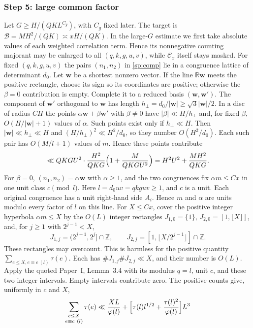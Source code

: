 \subsubsection*{Step 5: large common factor}
Let $G\ge H/(QKL^{C_g})$, with $C_g$ fixed later. The target is
$\mathcal B=MH^2/(QK)\asymp xH/(QK)$. In the large-$G$ estimate
we first take absolute values of each weighted correlation term.
Hence its nonnegative counting majorant may be enlarged to all
$(q,k,g,u,v)$, while $\mathcal C_x$ itself stays masked.
For fixed $(q,k,g,u,v)$ the pairs
$(n_1,n_2)$ in \eqref{sp:comp} lie in a congruence lattice of determinant
$d_0$. Let
$\mathbf w$ be a shortest nonzero vector. If the line
$\mathbb R\mathbf w$ meets the positive rectangle, choose its sign so its
coordinates are positive; otherwise the $\beta=0$ contribution is empty.
Complete it to a reduced basis
$(\mathbf w,\mathbf w')$. The component of $\mathbf w'$ orthogonal to
$\mathbf w$ has length $h_\perp=d_0/|\mathbf w|\ge\sqrt3|\mathbf w|/2$. In a
disc of radius $CH$ the points $\alpha\mathbf w+\beta\mathbf w'$ with
$\beta\ne0$ have $|\beta|\ll H/h_\perp$ and, for fixed $\beta$,
$O(H/|\mathbf w|+1)$ values of $\alpha$. Such points exist only if
$h_\perp\ll H$. Then $|\mathbf w|\ll h_\perp\ll H$ and
$(H/h_\perp)^2\ll H^2/d_0$, so they number $O(H^2/d_0)$. Each such pair has $O(M/l+1)$ values of
$m$. Hence these points contribute
\[
 \ll QKGU^2\cdot\frac{H^2}{QKG}\Bigl(1+\frac M{QKGU^2}\Bigr)=H^2U^2+\frac{MH^2}{QKG}.
\]
For $\beta=0$, $(n_1,n_2)=\alpha\mathbf w$ with $\alpha\ge1$, and the two
congruences fix $\alpha m\le Cx$ in one unit class $c\pmod l$.
Here $l=d_0uv=qkguv\ge1$, and $c$ is a unit. Each original
congruence has a unit right-hand side $A_i$. Hence $m$ and $\alpha$
are units modulo every factor of $l$ on this line.
For $X\le Cx$, cover the positive integer hyperbola $\alpha m\le X$
by the $O(L)$ integer rectangles $J_{1,0}=\{1\}$,
$J_{2,0}=[1,\lfloor X\rfloor]$, and, for $j\ge1$ with $2^{j-1}<X$,
\[
 J_{1,j}=(2^{j-1},2^j]\cap\mathbb Z,\qquad
 J_{2,j}=[1,\lfloor X/2^{j-1}\rfloor]\cap\mathbb Z.
\]
These rectangles may overcount. This is harmless for the positive
quantity $\sum_{e\le X,e\equiv c\ (l)}\tau(e)$. Each has
$\#J_{1,j}\#J_{2,j}\ll X$, and their number is $O(L)$.
Apply the quoted Paper~I, Lemma~3.4 with its modulus
$q=l$, unit $c$, and these two integer intervals. Empty intervals
contribute zero. The positive counts give, uniformly in $c$ and $X$,
\begin{equation}\label{sp:TP}
 \sum_{\substack{e\le X\\e\equiv c\ (l)}}\tau(e)
 \ll\frac{XL}{\varphi(l)}+\Bigl[\tau(l)l^{1/2}+\frac{\tau(l)^2}{\varphi(l)}\Bigr]L^3
\end{equation}
